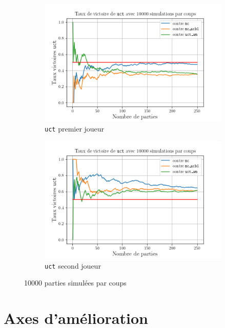 \documentclass[a4paper]{article}
\theoremstyle{definition}
\begin{document}
\begin{figure}[!h]
	\centering
	\begin{subfigure}{0.49\textwidth}
		\centering
		\includegraphics[width=\textwidth]{n10000_uct_snd.png}
		\caption{\texttt{uct} premier joueur}
		\label{fig:n10000-uct-snd}
	\end{subfigure}
	\hfill
	\begin{subfigure}{0.49\textwidth}
		\centering
		\includegraphics[width=\textwidth]{n10000_uct_first.png}
		\caption{\texttt{uct} second joueur}
		\label{fig:n10000-uct-first}
	\end{subfigure}
	\caption{10000 parties simulées par coups}
	\label{fig:n10000}
\end{figure}

\newpage

\section{Axes d'amélioration}
\end{document}
